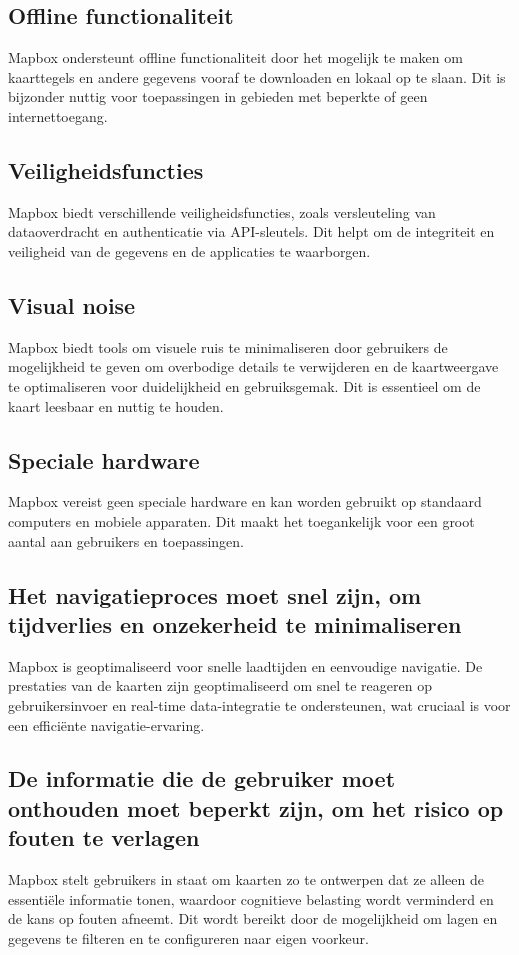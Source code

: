 \subsection*{Offline functionaliteit}
Mapbox ondersteunt offline functionaliteit door het mogelijk te maken om kaarttegels en andere gegevens vooraf te downloaden en lokaal op te slaan. Dit is bijzonder nuttig voor toepassingen in gebieden met beperkte of geen internettoegang.

\subsection*{Veiligheidsfuncties}
Mapbox biedt verschillende veiligheidsfuncties, zoals versleuteling van dataoverdracht en authenticatie via API-sleutels. Dit helpt om de integriteit en veiligheid van de gegevens en de applicaties te waarborgen.

\subsection*{Visual noise}
Mapbox biedt tools om visuele ruis te minimaliseren door gebruikers de mogelijkheid te geven om overbodige details te verwijderen en de kaartweergave te optimaliseren voor duidelijkheid en gebruiksgemak. Dit is essentieel om de kaart leesbaar en nuttig te houden.

\subsection*{Speciale hardware}
Mapbox vereist geen speciale hardware en kan worden gebruikt op standaard computers en mobiele apparaten. Dit maakt het toegankelijk voor een groot aantal aan gebruikers en toepassingen.

\subsection*{Het navigatieproces moet snel zijn, om tijdverlies en onzekerheid te minimaliseren}
Mapbox is geoptimaliseerd voor snelle laadtijden en eenvoudige navigatie. De prestaties van de kaarten zijn geoptimaliseerd om snel te reageren op gebruikersinvoer en real-time data-integratie te ondersteunen, wat cruciaal is voor een efficiënte navigatie-ervaring.

\subsection*{De informatie die de gebruiker moet onthouden moet beperkt zijn, om het risico op fouten te verlagen}
Mapbox stelt gebruikers in staat om kaarten zo te ontwerpen dat ze alleen de essentiële informatie tonen, waardoor cognitieve belasting wordt verminderd en de kans op fouten afneemt. Dit wordt bereikt door de mogelijkheid om lagen en gegevens te filteren en te configureren naar eigen voorkeur.

